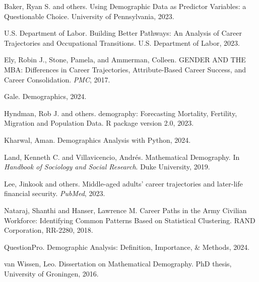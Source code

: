 \documentclass[../main.tex]{subfiles}
\begin{document}
\begin{thebibliography}{99}

Baker, Ryan S. and others.
\newblock Using Demographic Data as Predictor Variables: a Questionable Choice.
\newblock University of Pennsylvania, 2023.

U.S. Department of Labor.
\newblock Building Better Pathways: An Analysis of Career Trajectories and Occupational Transitions.
\newblock U.S. Department of Labor, 2023.

Ely, Robin J., Stone, Pamela, and Ammerman, Colleen.
\newblock GENDER AND THE MBA: Differences in Career Trajectories, Attribute-Based Career Success, and Career Consolidation.
\newblock \emph{PMC}, 2017.

Gale.
\newblock Demographics, 2024.

Hyndman, Rob J. and others.
\newblock demography: Forecasting Mortality, Fertility, Migration and Population Data.
\newblock R package version 2.0, 2023.

Kharwal, Aman.
\newblock Demographics Analysis with Python, 2024.

Land, Kenneth C. and Villavicencio, Andrés.
\newblock Mathematical Demography.
\newblock In \emph{Handbook of Sociology and Social Research}. Duke University, 2019.

Lee, Jinkook and others.
\newblock Middle-aged adults' career trajectories and later-life financial security.
\newblock \emph{PubMed}, 2023.

Nataraj, Shanthi and Hanser, Lawrence M.
\newblock Career Paths in the Army Civilian Workforce: Identifying Common Patterns Based on Statistical Clustering.
\newblock RAND Corporation, RR-2280, 2018.

QuestionPro.
\newblock Demographic Analysis: Definition, Importance, \& Methods, 2024.

van Wissen, Leo.
\newblock Dissertation on Mathematical Demography.
\newblock PhD thesis, University of Groningen, 2016.

\end{thebibliography}
\end{document}
